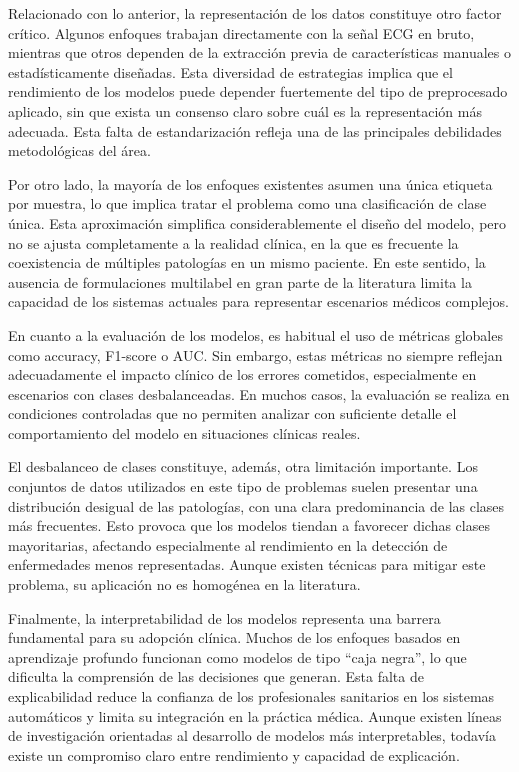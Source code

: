 \documentclass[12pt,a4paper,twoside]{book}
\begin{document}
Relacionado con lo anterior, la representación de los datos constituye otro factor crítico. 
Algunos enfoques trabajan directamente con la señal ECG en bruto, mientras que otros dependen de la extracción previa de características manuales o estadísticamente diseñadas. 
Esta diversidad de estrategias implica que el rendimiento de los modelos puede depender fuertemente del tipo de preprocesado aplicado, sin que exista un consenso claro sobre cuál es la representación más adecuada. 
Esta falta de estandarización refleja una de las principales debilidades metodológicas del área.

Por otro lado, la mayoría de los enfoques existentes asumen una única etiqueta por muestra, lo que implica tratar el problema como una clasificación de clase única. 
Esta aproximación simplifica considerablemente el diseño del modelo, pero no se ajusta completamente a la realidad clínica, en la que es frecuente la coexistencia de múltiples patologías en un mismo paciente. 
En este sentido, la ausencia de formulaciones multilabel en gran parte de la literatura limita la capacidad de los sistemas actuales para representar escenarios médicos complejos.

En cuanto a la evaluación de los modelos, es habitual el uso de métricas globales como accuracy, F1-score o AUC. 
Sin embargo, estas métricas no siempre reflejan adecuadamente el impacto clínico de los errores cometidos, especialmente en escenarios con clases desbalanceadas. 
En muchos casos, la evaluación se realiza en condiciones controladas que no permiten analizar con suficiente detalle el comportamiento del modelo en situaciones clínicas reales.

El desbalanceo de clases constituye, además, otra limitación importante. 
Los conjuntos de datos utilizados en este tipo de problemas suelen presentar una distribución desigual de las patologías, con una clara predominancia de las clases más frecuentes. 
Esto provoca que los modelos tiendan a favorecer dichas clases mayoritarias, afectando especialmente al rendimiento en la detección de enfermedades menos representadas. 
Aunque existen técnicas para mitigar este problema, su aplicación no es homogénea en la literatura.

Finalmente, la interpretabilidad de los modelos representa una barrera fundamental para su adopción clínica. 
Muchos de los enfoques basados en aprendizaje profundo funcionan como modelos de tipo “caja negra”, lo que dificulta la comprensión de las decisiones que generan. 
Esta falta de explicabilidad reduce la confianza de los profesionales sanitarios en los sistemas automáticos y limita su integración en la práctica médica. 
Aunque existen líneas de investigación orientadas al desarrollo de modelos más interpretables, todavía existe un compromiso claro entre rendimiento y capacidad de explicación.
\end{document}

